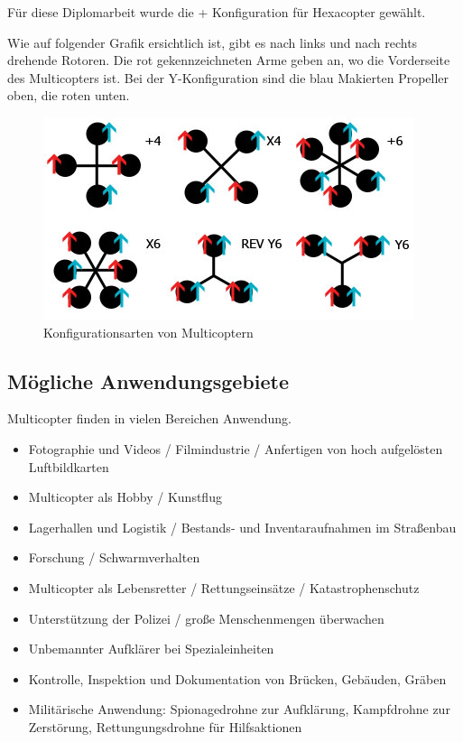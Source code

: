   Für diese Diplomarbeit wurde die + Konfiguration für Hexacopter gewählt.

  Wie auf folgender Grafik ersichtlich ist, gibt es nach links und nach rechts drehende Rotoren. Die rot gekennzeichneten Arme geben an, wo die Vorderseite des Multicopters ist. Bei der Y-Konfiguration sind die blau Makierten Propeller oben, die roten unten.

    \begin{figure}[tbh]
      \begin{centering}
        \includegraphics[width = \textwidth]{Bilder/bor_copter_konfig}
      \par\end{centering}
      \caption{Konfigurationsarten von Multicoptern}
      \label{Flussdiragramm}
    \end{figure}

  \subsection{Mögliche Anwendungsgebiete}
  Multicopter finden in vielen Bereichen Anwendung. \cite{copterAnwendung}
  \begin{itemize}
    \item Fotographie und Videos / Filmindustrie / Anfertigen von hoch aufgelösten Luftbildkarten
    \item Multicopter als Hobby / Kunstflug
    \item Lagerhallen und Logistik / Bestands- und Inventaraufnahmen im Straßenbau
    \item Forschung / Schwarmverhalten
    \item Multicopter als Lebensretter / Rettungseinsätze / Katastrophenschutz
    \item Unterstützung der Polizei / große Menschenmengen überwachen
    \item Unbemannter Aufklärer bei Spezialeinheiten
    \item Kontrolle, Inspektion und Dokumentation von Brücken, Gebäuden, Gräben
    \item Militärische Anwendung: Spionagedrohne zur Aufklärung, Kampfdrohne zur Zerstörung, Rettungungsdrohne für Hilfsaktionen
  \end{itemize}


